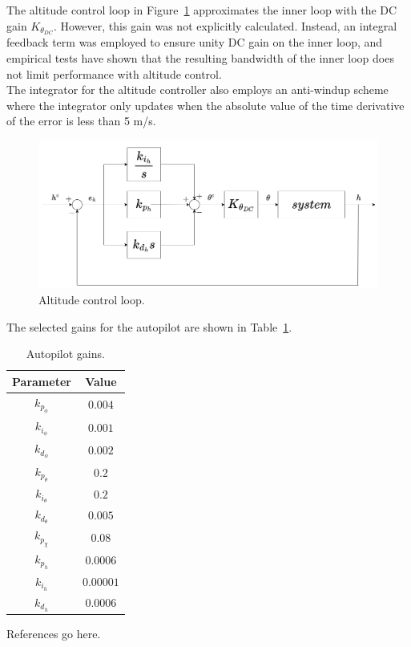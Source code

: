 \documentclass{article}
\begin{document}
\FloatBarrier
The altitude control loop in Figure~\ref{fig:altitude_control} approximates the inner loop with the DC gain $K_{\theta_{DC}}$. However, this gain was not explicitly calculated. Instead, an integral feedback term was employed to ensure unity DC gain on the inner loop, and empirical tests have shown that the resulting bandwidth of the inner loop does not limit performance with altitude control. \\
The integrator for the altitude controller also employs an anti-windup scheme where the integrator only updates when the absolute value of the time derivative of the error is less than 5 m/s.

\begin{figure}[h!]
    \includegraphics[width=1.0\linewidth]{./figures/altitude_controller.drawio.png}
    \caption{Altitude control loop.}
\label{fig:altitude_control}

\end{figure} 

\FloatBarrier

The selected gains for the autopilot are shown in Table~\ref{tab:autopilot_gains}.

\begin{table}[h!]
\caption{Autopilot gains.}
\centering
 \begin{tabular}{||c c||} 
 \hline
 Parameter & Value \\ [0.5ex] 
 \hline\hline
 $k_{p_\phi}$ & $0.004$\\ 
 $k_{i_\phi}$ & $0.001$\\
 $k_{d_\phi}$ & $0.002$\\
 $k_{p_\theta}$ & $0.2$\\
 $k_{i_\theta}$ & $0.2$\\
 $k_{d_\theta}$ & $0.005$\\
 $k_{p_\chi}$ & $0.08$\\
 $k_{p_h}$ & $0.0006$\\
 $k_{i_h}$ & $0.00001$\\
 $k_{d_h}$ & $0.0006$\\[1ex] 
 \hline
 \end{tabular}
 \label{tab:autopilot_gains}
\end{table}

\FloatBarrier


References go here.
\end{document}
